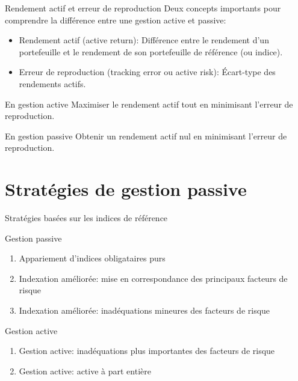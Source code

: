 \documentclass{beamer}
\begin{document}
\begin{frame}{Rendement actif et erreur de reproduction}
Deux concepts importants pour comprendre la différence entre une gestion active et passive: 
\begin{itemize}[label=\bullet]
\item Rendement actif (active return): Différence entre le rendement d’un portefeuille et le rendement de son portefeuille de référence (ou indice).
\item Erreur de reproduction (tracking error ou active risk): Écart-type des rendements actifs.  
\end{itemize}
\begin{block}{En gestion active}
Maximiser le rendement actif tout en minimisant l’erreur de reproduction.  
\end{block}

\begin{block}{En gestion passive}
Obtenir un rendement actif nul en minimisant l’erreur de reproduction.
\end{block}

\end{frame}

\section{Stratégies de gestion passive}
\begin{frame}{Stratégies basées sur les indices de référence}
\begin{block}{Gestion passive}
\begin{enumerate}[label=\arabic*)]
\item Appariement d'indices obligataires purs
\item Indexation améliorée: mise en correspondance des principaux facteurs de risque
\item Indexation améliorée: inadéquations mineures des facteurs de risque
\end{enumerate}
\end{block}
\begin{block}{Gestion active}
\begin{enumerate}[label=\arabic*)]
\item Gestion active: inadéquations plus importantes des facteurs de risque
\item Gestion active: active à part entière
\end{enumerate}
\end{block}
\end{frame}
\end{document}

